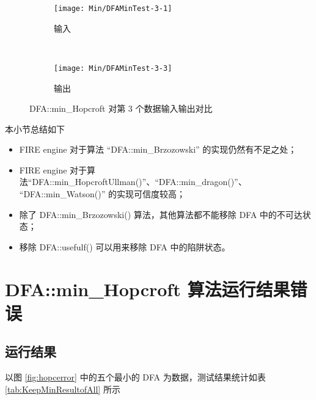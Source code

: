 \begin{figure}[!htbp]
    \centering
    \begin{subfigure}[b]{0.4\textwidth}
        \texttt{[image: Min/DFAMinTest-3-1]}
        \caption{输入}
        \label{fig:DFAMin-3-1-inside}
    \end{subfigure}
    ~
    \begin{subfigure}[b]{0.4\textwidth}
        \texttt{[image: Min/DFAMinTest-3-3]}
        \caption{输出}
        \label{fig:DFAMin-3-3-inside}
    \end{subfigure}
    \caption{DFA::min\_Hopcroft 对第 3 个数据输入输出对比}
    \label{fig:DFAMinHoop-3}
  \end{figure}


本小节总结如下
\begin{itemize}
    \item FIRE engine 对于算法 “DFA::min\_Brzozowski” 的实现仍然有不足之处；
    \item FIRE engine 对于算法“DFA::min\_HopcroftUllman()”、“DFA::min\_dragon()”、\\ “DFA::min\_Watson()” 的实现可信度较高；
    \item 除了 DFA::min\_Brzozowski() 算法，其他算法都不能移除 DFA 中的不可达状态；
    \item 移除 DFA::usefulf() 可以用来移除 DFA 中的陷阱状态。
\end{itemize}


\newpage
\section{DFA::min\_Hopcroft 算法运行结果错误}\label{sec:fixHopcroft}

\subsection{运行结果}

以图 \ref{fig:hopcerror} 中的五个最小的 DFA 为数据，测试结果统计如表 \ref{tab:KeepMinResultofAll} 所示

